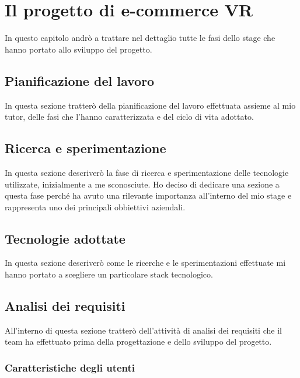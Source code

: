 \newpage
\chapter{Il progetto di e-commerce VR}
\label{cap:ilprogettoe-commercevr}

In questo capitolo andrò a trattare nel dettaglio tutte le fasi dello stage che hanno portato allo sviluppo del progetto.

\section{Pianificazione del lavoro}

In questa sezione tratterò della pianificazione del lavoro effettuata assieme al mio tutor, delle fasi che l'hanno caratterizzata e del ciclo di vita adottato. 

\section{Ricerca e sperimentazione}

In questa sezione descriverò la fase di ricerca e sperimentazione delle tecnologie utilizzate, inizialmente a me sconosciute. Ho deciso di dedicare una sezione a questa fase perché ha avuto una rilevante importanza all'interno del mio stage e rappresenta uno dei principali obbiettivi aziendali.

\section{Tecnologie adottate}

In questa sezione descriverò come le ricerche e le sperimentazioni effettuate mi hanno portato a scegliere un particolare stack tecnologico.

\section{Analisi dei requisiti}

All'interno di questa sezione tratterò dell'attività di analisi dei requisiti che il team ha effettuato prima della progettazione e dello sviluppo del progetto.

\subsection{Caratteristiche degli utenti}

